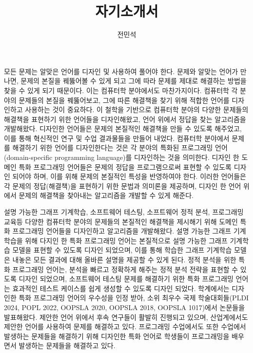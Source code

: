 \documentclass[11pt]{article}
\begin{document}
\title{자기소개서}

\author{전민석}



\newcommand{\DisjunctiveModel}{\textsc{Disjunctive Model}}
\newcommand{\FeatureLanguage}{\textsc{Feature Language}}
\newcommand{\GDL}{\textsc{Graph Description Language}}
\newcommand{\PLXGL}{\textsc{PL4XGL}}


\newcommand{\AbstractRelativeWritePattern}{\textsc{Abstract Relative Write Pattern}}

\maketitle 
\begin{spacing}{1.145}
모든 문제는 알맞은 언어를 디자인 및 사용하여 풀어야 한다.
%
문제와 알맞는 언어가 만나면, 문제의 본질을 꿰뚫어볼 수 있게 되고 그에 따라 문제를 제대로 해결하는 방법을 찾을 수 있게 되기 때문이다.
%
이는 컴퓨터학 분야에서도 마찬가지이다.
%
컴퓨터학 각 분야의 문제들의 본질을 꿰뚫어보고, 그에 따른 해결책을 찾기 위해 적합한 언어를 디자인하고 사용하는 것이 중요하다.
%
이 철학을 기반으로 컴퓨터학 분야의 다양한 문제들의 해결책을 표현하기 위한 언어들을 디자인해왔고, 언어 위에서 정답을 찾는 알고리즘을 개발해왔다.
%
디자인한 언어들은 문제의 본질적인 해결책을 만들 수 있도록 해주었고, 이를 통해 혁신적인 연구 및 수업 결과물들을 만들어 내었다.
%
컴퓨터학 분야에서 문제를 해결하기 위한 언어를 디자인한다는 것은 각 분야의 특화된 프로그래밍 언어(domain-specific programming language)를 디자인하는 것을 의미한다.
%
디자인 한 도메인 특화 프로그래밍 언어들은 문제의 정답을 프로그램으로써 표현할 수 있도록 디자인 되어야 하며, 이를 위해 문제의 본질적인 특성을 반영하여야 한다.
%
이러한 언어들은 각 문제의 정답(해결책)을 표현하기 위한 문법과 의미론을 제공하며, 디자인 한 언어 위에서 문제의 해결책을 찾아내는 알고리즘을 개발할 수 있게 해준다.



설명 가능한 그래프 기계학습, 소프트웨어 테스팅, 소프트웨어 정적 분석, 프로그래밍 교육등 다양한 컴퓨터학 분야의 문제들의 본질적인 해결책을 제시해기 위해 도메인 특화 프로그래밍 언어들을 디자인하고 알고리즘을 개발해왔다.
%
설명 가능한 그래프 기계학습을 위해 다지인 한 특화 프로그래밍 언어는 본질적으로 설명 가능한 그래프 기계학습 모델을 표현할 수 있도록 디자인 되었으며, 이를 통해 학습한 그래프 기계학습 모델은 내놓은 모든 결과에 대해 올바른 설명을 제공할 수 있게 된다.
%
정적 분석을 위한 특화 프로그래밍 언어는, 분석을 빠르고 정확하게 해주는 정적 분석 전략을 표현할 수 있도록 디자인 되었으며, 소프트웨어 테스팅 문제를 해결하기 위한 특화 프로그래밍 언어는 효과적인 테스트 케이스를 쉽게 생성할 수 있도록 디자인 되었다.
%
학계에서는 디자인한 특화 프로그래밍 언어의 우수성을 인정 받아, 소위 최우수 국제 학술대회들(PLDI 2024, POPL 2022, OOPSLA 2020, OOPSLA 2018, OOPSLA 1017)에서 논문들을 발표해왔다.
%
제안한 언어 위에서 후속 연구들이 활발히 진행되고 있으며, 산업계에서도 제안한 언어를 사용하여 문제를 해결하고 있다.
%
프로그래밍 수업에서도 또한 수업에서 발생하는 문제들을 해결하기 위해 디자인한 특화 언어로 학생들이 프로그래밍을 배우면서 발생하는 문제들을 해결하고 있다.






\end{spacing}
\end{document}
